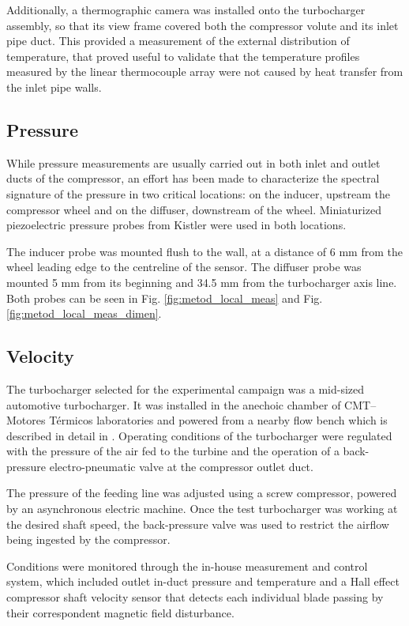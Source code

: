 Additionally, a thermographic camera was installed onto the turbocharger assembly, so that its view frame covered both the compressor volute and its inlet pipe duct. This provided a measurement of the external distribution of temperature, that proved useful to validate that the temperature profiles measured by the linear thermocouple array were not caused by heat transfer from the inlet pipe walls.

\subsection{Pressure}

While pressure measurements are usually carried out in both inlet and outlet ducts of the compressor, an effort has been made to characterize the spectral signature of the pressure in two critical locations: on the inducer, upstream the compressor wheel and on the diffuser, downstream of the wheel. Miniaturized piezoelectric pressure probes from Kistler were used in both locations. 

The inducer probe was mounted flush to the wall, at a distance of 6 mm from the wheel leading edge to the centreline of the sensor. The diffuser probe was mounted 5 mm from its beginning and 34.5 mm from the turbocharger axis line. Both probes can be seen in Fig. \ref{fig:metod_local_meas} and Fig. \ref{fig:metod_local_meas_dimen}.

\subsection{Velocity}

The turbocharger selected for the experimental campaign was a mid-sized automotive turbocharger. It was installed in the anechoic chamber of CMT--Motores Térmicos laboratories and powered from a nearby flow bench which is described in detail in \cite{galindo2006surge}. Operating conditions of the turbocharger were regulated with the pressure of the air fed to the turbine and the operation of a back-pressure electro-pneumatic valve at the compressor outlet duct.

The pressure of the feeding line was adjusted using a screw compressor, powered by an asynchronous electric machine. Once the test turbocharger was working at the desired shaft speed, the back-pressure valve was used to restrict the airflow being ingested by the compressor.

Conditions were monitored through the in-house measurement and control system, which included outlet in-duct pressure and temperature and a Hall effect compressor shaft velocity sensor that detects each individual blade passing by their correspondent magnetic field disturbance.

